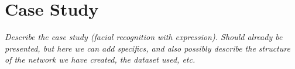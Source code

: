 
\chapter{Case Study}

\textit{Describe the case study (facial recognition with expression).
Should already be presented, but here we can add specifics, and also possibly describe the structure of the network we have created, the dataset used, etc.}

\cleardoublepage